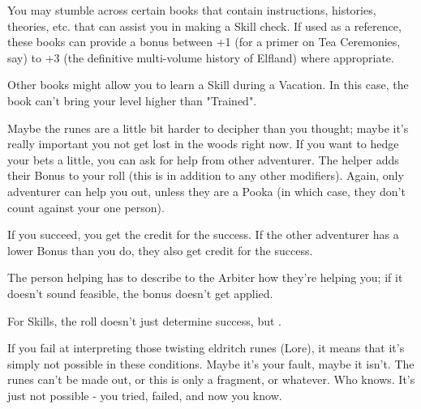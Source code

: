 {   

   You may stumble across certain books that contain instructions, histories, theories, etc. that can assist you in making a Skill check.  If used as a reference, these books can provide a bonus between +1 (for a primer on Tea Ceremonies, say) to +3 (the definitive multi-volume history of Elfland) where appropriate. 

   Other books might allow you to learn a Skill during a Vacation.  In this case, the book can't bring your level higher than "Trained".



  Maybe the runes are a little bit harder to decipher than you thought; maybe it's really important you not get lost in the woods right now.  If you want to hedge your bets a little, you can ask for help from  other adventurer.  The helper adds their Bonus to your roll (this is in addition to any other modifiers).  Again, only  adventurer can help you out, unless they are a Pooka (in which case, they don't count against your one person).

  If you succeed, you get the credit for the success.  If the other adventurer has a lower Bonus than you do, they also get credit for the success.


  The person helping has to describe to the Arbiter how they're helping you; if it doesn't sound feasible, the bonus doesn't get applied.



  For Skills, the \RO roll doesn't just determine success, but .  

  If you fail at interpreting those twisting eldritch runes (Lore), it means that it's simply not possible in these conditions.  Maybe it's your fault, maybe it isn't.  The runes can't be made out, or this is only a fragment, or whatever.  Who knows.  It's just not possible - you tried, failed, and now you know.

}
